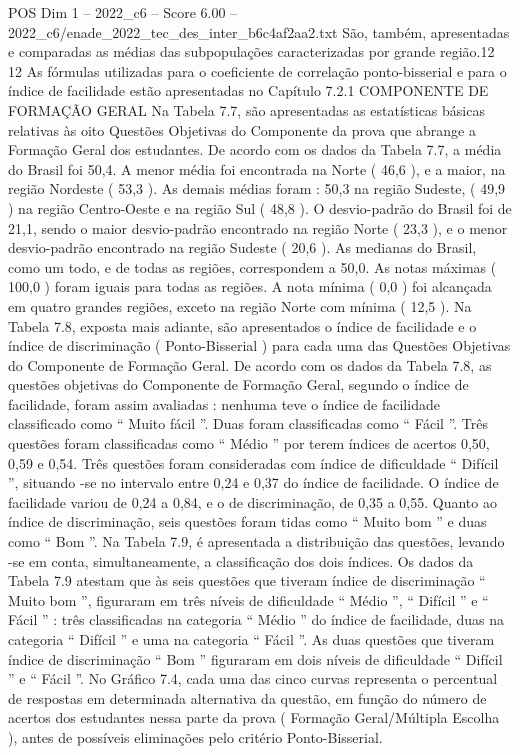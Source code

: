 \begin{textsample}{POS Dim 1 – 2022\_c6 – Score 6.00 – 2022\_c6/enade\_2022\_tec\_des\_inter\_b6c4af2aa2.txt}
São, também, apresentadas e comparadas as médias das subpopulações caracterizadas por grande região.12 12 As fórmulas utilizadas para o coeficiente de correlação ponto-bisserial e para o índice de facilidade estão apresentadas no Capítulo 7.2.1 COMPONENTE DE FORMAÇÃO GERAL Na Tabela 7.7, são apresentadas as estatísticas básicas relativas às oito Questões Objetivas do Componente da prova que abrange a Formação Geral dos estudantes.
De acordo com os dados da Tabela 7.7, a média do Brasil foi 50,4.
A menor média foi encontrada na Norte ( 46,6 ), e a maior, na região Nordeste ( 53,3 ).
As demais médias foram : 50,3 na região Sudeste, ( 49,9 ) na região Centro-Oeste e na região Sul ( 48,8 ).
O desvio-padrão do Brasil foi de 21,1, sendo o maior desvio-padrão encontrado na região Norte ( 23,3 ), e o menor desvio-padrão encontrado na região Sudeste ( 20,6 ).
As medianas do Brasil, como um todo, e de todas as regiões, correspondem a 50,0.
As notas máximas ( 100,0 ) foram iguais para todas as regiões.
A nota mínima ( 0,0 ) foi alcançada em quatro grandes regiões, exceto na região Norte com mínima ( 12,5 ).
Na Tabela 7.8, exposta mais adiante, são apresentados o índice de facilidade e o índice de discriminação ( Ponto-Bisserial ) para cada uma das Questões Objetivas do Componente de Formação Geral.
De acordo com os dados da Tabela 7.8, as questões objetivas do Componente de Formação Geral, segundo o índice de facilidade, foram assim avaliadas : nenhuma teve o índice de facilidade classificado como “ Muito fácil ”.
Duas foram classificadas como “ Fácil ”.
Três questões foram classificadas como “ Médio ” por terem índices de acertos 0,50, 0,59 e 0,54.
Três questões foram consideradas com índice de dificuldade “ Difícil ”, situando -se no intervalo entre 0,24 e 0,37 do índice de facilidade.
O índice de facilidade variou de 0,24 a 0,84, e o de discriminação, de 0,35 a 0,55.
Quanto ao índice de discriminação, seis questões foram tidas como “ Muito bom ” e duas como “ Bom ”.
Na Tabela 7.9, é apresentada a distribuição das questões, levando -se em conta, simultaneamente, a classificação dos dois índices.
Os dados da Tabela 7.9 atestam que às seis questões que tiveram índice de discriminação “ Muito bom ”, figuraram em três níveis de dificuldade “ Médio ”, “ Difícil ” e “ Fácil ” : três classificadas na categoria “ Médio ” do índice de facilidade, duas na categoria “ Difícil ” e uma na categoria “ Fácil ”.
As duas questões que tiveram índice de discriminação “ Bom ” figuraram em dois níveis de dificuldade “ Difícil ” e “ Fácil ”.
No Gráfico 7.4, cada uma das cinco curvas representa o percentual de respostas em determinada alternativa da questão, em função do número de acertos dos estudantes nessa parte da prova ( Formação Geral/Múltipla Escolha ), antes de possíveis eliminações pelo critério Ponto-Bisserial.

\end{textsample}
